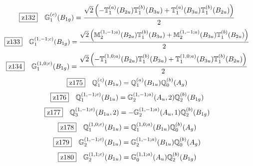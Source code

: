 \documentclass[fleqn,10pt,landscape]{jsarticle}
\begin{document}
\begin{dmath*}
\hspace*{3mm}\fbox{z132}\quad \mathbb{G}_{1}^{(c)}(B_{1g})=\frac{\sqrt{2} \left(- \mathbb{T}_{1}^{(a)}(B_{2u}) \mathbb{T}_{1}^{(b)}(B_{3u}) + \mathbb{T}_{1}^{(a)}(B_{3u}) \mathbb{T}_{1}^{(b)}(B_{2u})\right)}{2}
\end{dmath*}
\begin{dmath*}
\hspace*{3mm}\fbox{z133}\quad \mathbb{G}_{1}^{(1,-1;c)}(B_{1g})=\frac{\sqrt{2} \left(\mathbb{M}_{2}^{(1,-1;a)}(B_{2u}) \mathbb{T}_{1}^{(b)}(B_{3u}) + \mathbb{M}_{2}^{(1,-1;a)}(B_{3u}) \mathbb{T}_{1}^{(b)}(B_{2u})\right)}{2}
\end{dmath*}
\begin{dmath*}
\hspace*{3mm}\fbox{z134}\quad \mathbb{G}_{1}^{(1,0;c)}(B_{1g})=\frac{\sqrt{2} \left(- \mathbb{T}_{1}^{(1,0;a)}(B_{2u}) \mathbb{T}_{1}^{(b)}(B_{3u}) + \mathbb{T}_{1}^{(1,0;a)}(B_{3u}) \mathbb{T}_{1}^{(b)}(B_{2u})\right)}{2}
\end{dmath*}
\begin{dmath*}
\hspace*{3mm}\fbox{z175}\quad \mathbb{Q}_{1}^{(c)}(B_{1u})=\mathbb{Q}_{1}^{(a)}(B_{1u}) \mathbb{Q}_{0}^{(b)}(A_{g})
\end{dmath*}
\begin{dmath*}
\hspace*{3mm}\fbox{z176}\quad \mathbb{Q}_{1}^{(1,-1;c)}(B_{1u})=\mathbb{G}_{2}^{(1,-1;a)}(A_{u},2) \mathbb{Q}_{2}^{(b)}(B_{1g})
\end{dmath*}
\begin{dmath*}
\hspace*{3mm}\fbox{z177}\quad \mathbb{Q}_{3}^{(1,-1;c)}(B_{1u},2)=- \mathbb{G}_{2}^{(1,-1;a)}(A_{u},1) \mathbb{Q}_{2}^{(b)}(B_{1g})
\end{dmath*}
\begin{dmath*}
\hspace*{3mm}\fbox{z178}\quad \mathbb{Q}_{1}^{(1,0;c)}(B_{1u})=\mathbb{Q}_{1}^{(1,0;a)}(B_{1u}) \mathbb{Q}_{0}^{(b)}(A_{g})
\end{dmath*}
\begin{dmath*}
\hspace*{3mm}\fbox{z179}\quad \mathbb{G}_{2}^{(1,-1;c)}(B_{1u})=\mathbb{G}_{2}^{(1,-1;a)}(B_{1u}) \mathbb{Q}_{0}^{(b)}(A_{g})
\end{dmath*}
\begin{dmath*}
\hspace*{3mm}\fbox{z180}\quad \mathbb{G}_{2}^{(1,1;c)}(B_{1u})=\mathbb{G}_{0}^{(1,1;a)}(A_{u}) \mathbb{Q}_{2}^{(b)}(B_{1g})
\end{dmath*}
\end{document}
